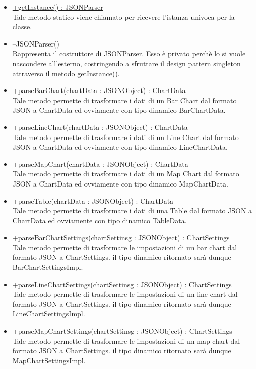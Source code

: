 \begin{itemize}
\begin{itemize}
					\item[\ding{111}] {\underline{+getInstance() : JSONParser}} \\ [1mm] Tale metodo statico viene chiamato per ricevere l'istanza univoca per la classe.
					\item[\ding{111}] {{--JSONParser()}} \\ [1mm] Rappresenta il costruttore di JSONParser. Esso è privato perchè lo si vuole nascondere all'esterno, costringendo a sfruttare il design pattern singleton attraverso il metodo getInstance().
					\item[\ding{111}] {{+parseBarChart(chartData : JSONObject) : ChartData}} \\ [1mm] Tale metodo permette di trasformare i dati di un Bar Chart dal formato JSON a ChartData ed ovviamente con tipo dinamico BarChartData.
					\item[\ding{111}] {{+parseLineChart(chartData : JSONObject) : ChartData}} \\ [1mm] Tale metodo permette di trasformare i dati di un Line Chart dal formato JSON a ChartData ed ovviamente con tipo dinamico LineChartData.
					\item[\ding{111}] {{+parseMapChart(chartData : JSONObject) : ChartData}} \\ [1mm] Tale metodo permette di trasformare i dati di un Map Chart dal formato JSON a ChartData ed ovviamente con tipo dinamico MapChartData.
					\item[\ding{111}] {{+parseTable(chartData : JSONObject) : ChartData}} \\ [1mm] Tale metodo permette di trasformare i dati di una Table dal formato JSON a ChartData ed ovviamente con tipo dinamico TableData.
					\item[\ding{111}] {{+parseBarChartSettings(chartSettinsg : JSONObject) : ChartSettings}} \\ [1mm] Tale metodo permette di trasformare le impostazioni di un bar chart dal formato JSON a ChartSettings. il tipo dinamico ritornato sarà dunque BarChartSettingsImpl.
					\item[\ding{111}] {{+parseLineChartSettings(chartSettinsg : JSONObject) : ChartSettings}} \\ [1mm] Tale metodo permette di trasformare le impostazioni di un line chart dal formato JSON a ChartSettings. il tipo dinamico ritornato sarà dunque LineChartSettingsImpl.
					\item[\ding{111}] {{+parseMapChartSettings(chartSettinsg : JSONObject) : ChartSettings}} \\ [1mm] Tale metodo permette di trasformare le impostazioni di un map chart dal formato JSON a ChartSettings. il tipo dinamico ritornato sarà dunque MapChartSettingsImpl.

\end{itemize}
\end{itemize}
